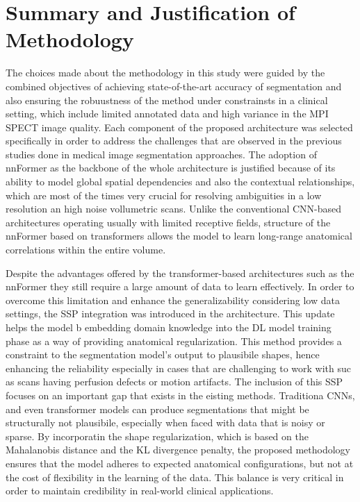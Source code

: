 \section{Summary and Justification of Methodology}
The choices made about the methodology in this study were guided by the combined objectives of achieving state-of-the-art accuracy of segmentation  and also ensuring the robuustness of the method under constrainsts in a clinical setting, which include limited annotated data and high variance in the MPI SPECT image quality. Each component of the proposed architecture was selected specifically in order to address the challenges that are observed in the previous studies done in medical image segmentation approaches. The adoption of nnFormer as the backbone of the whole architecture is justified because of its ability to model global spatial dependencies and also the contextual relationships, which are most of the times very crucial for resolving ambiguities in a low resolution an high noise vollumetric scans. Unlike the conventional CNN-based architectures operating usually with limited receptive fields, structure of the nnFormer based on transformers allows the model to learn long-range anatomical correlations within the entire volume.

Despite the advantages offered by the transformer-based architectures such as the nnFormer they still require a large amount of data to learn effectively. In order to overcome this limitation and enhance the generalizability considering low data settings, the SSP integration was introduced in the architecture. This update helps the model b embedding domain knowledge into the DL model training phase as a way of providing anatomical regularization. This method provides a constraint to the segmentation model's output to plausibile shapes, hence enhancing the reliability especially in cases that are challenging to work with suc as scans having perfusion defects or motion artifacts. The inclusion of this SSP focuses on an important gap that exists in the eisting methods. Traditiona CNNs, and even transformer models can produce segmentations that might be structurally not plausibile, especially when faced with data that is noisy or sparse. By incorporatin the shape regularization, which is based on the Mahalanobis distance and the KL divergence penalty, the proposed methodology ensures that the model adheres to expected anatomical configurations, but not at the cost of flexibility in the learning of the data. This balance is very critical in order to maintain credibility in real-world clinical applications.

